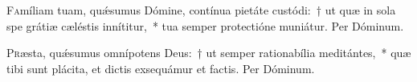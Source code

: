 \documentclass[vesperale_romanum.tex]{subfiles}
\begin{document}
\label{dom_5_pe}
{}


\oratio

\lettrine{F}{a}míliam tuam, quǽsumus Dómine, contínua pietáte custódi:~† ut quæ in sola spe grátiæ cæléstis innítitur,~* tua semper protectióne muniátur.
Per Dóminum.

\label{dom_6_pe}
{}


\oratio

\lettrine{P}{r}æsta, quǽsumus omnípotens Deus:~† ut semper rationabília meditántes,~* quæ tibi sunt plácita, et dictis exsequámur et factis. Per Dóminum.

\biggerrule
\end{document}
